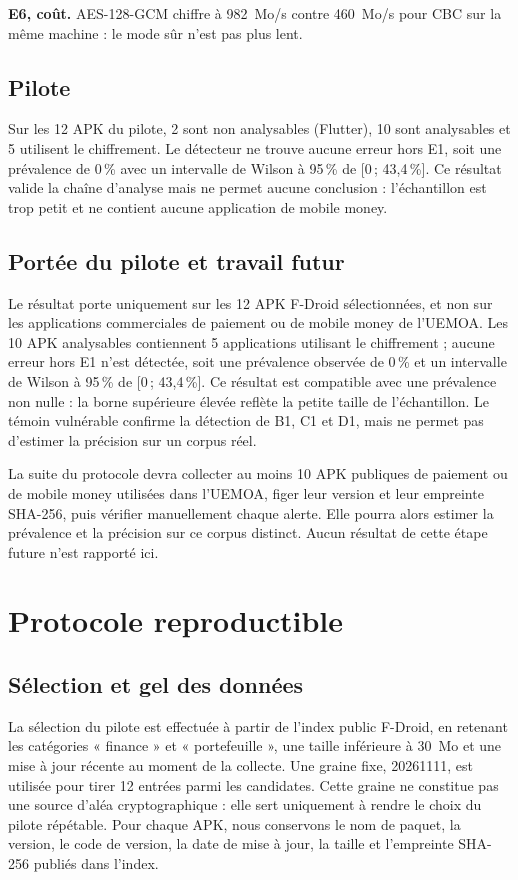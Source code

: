 \documentclass[conference,a4paper]{IEEEtran}
\begin{document}
\textbf{E6, coût.} AES-128-GCM chiffre à 982~Mo/s contre 460~Mo/s pour CBC sur la même machine : le mode sûr n'est pas plus lent.

\subsection{Pilote}
Sur les 12 APK du pilote, 2 sont non analysables (Flutter), 10 sont analysables et 5 utilisent le chiffrement. Le détecteur ne trouve aucune erreur hors E1, soit une prévalence de 0\,\% avec un intervalle de Wilson à 95\,\% de [0\,; 43,4\,\%]. Ce résultat valide la chaîne d'analyse mais ne permet aucune conclusion : l'échantillon est trop petit et ne contient aucune application de mobile money.

\subsection{Portée du pilote et travail futur}
Le résultat porte uniquement sur les 12 APK F-Droid sélectionnées, et non sur les applications commerciales de paiement ou de mobile money de l'UEMOA. Les 10 APK analysables contiennent 5 applications utilisant le chiffrement ; aucune erreur hors E1 n'est détectée, soit une prévalence observée de 0\,\% et un intervalle de Wilson à 95\,\% de [0\,; 43,4\,\%]. Ce résultat est compatible avec une prévalence non nulle : la borne supérieure élevée reflète la petite taille de l'échantillon. Le témoin vulnérable confirme la détection de B1, C1 et D1, mais ne permet pas d'estimer la précision sur un corpus réel.

La suite du protocole devra collecter au moins 10 APK publiques de paiement ou de mobile money utilisées dans l'UEMOA, figer leur version et leur empreinte SHA-256, puis vérifier manuellement chaque alerte. Elle pourra alors estimer la prévalence et la précision sur ce corpus distinct. Aucun résultat de cette étape future n'est rapporté ici.

\section{Protocole reproductible}

\subsection{Sélection et gel des données}
La sélection du pilote est effectuée à partir de l'index public F-Droid, en retenant les catégories « finance » et « portefeuille », une taille inférieure à 30~Mo et une mise à jour récente au moment de la collecte. Une graine fixe, 20261111, est utilisée pour tirer 12 entrées parmi les candidates. Cette graine ne constitue pas une source d'aléa cryptographique : elle sert uniquement à rendre le choix du pilote répétable. Pour chaque APK, nous conservons le nom de paquet, la version, le code de version, la date de mise à jour, la taille et l'empreinte SHA-256 publiés dans l'index.
\end{document}
